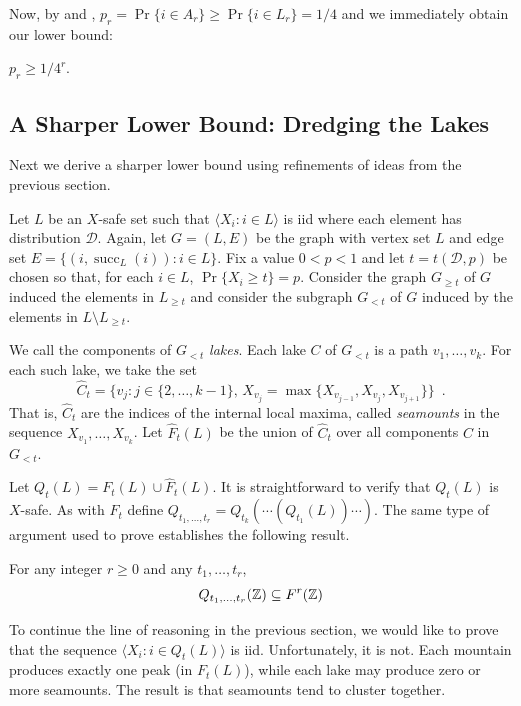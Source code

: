 \documentclass{patmorin}
\DeclareMathOperator{\cw}{succ}
\begin{document}
Now, by  and , $p_r=\Pr\{i\in
A_r\} \ge \Pr\{i\in L_r\}=1/4$ and we immediately obtain our lower bound:
\begin{cor}
   $p_r \ge 1/4^r$.
\end{cor}


\subsection{A Sharper Lower Bound: Dredging the Lakes}

Next we derive a sharper lower bound using refinements of ideas
from the previous section.

Let $L$ be an $X$-safe set such that $\langle X_i: i\in L\rangle$ is iid
where each element has distribution $\mathcal{D}$.  Again, let $G=(L,E)$
be the graph with vertex set $L$ and edge set $E=\{(i,\cw_L(i)): i\in
L\}$.  Fix a value $0<p<1$ and let $t=t(\mathcal{D},p)$ be chosen so that,
for each $i\in L$, $\Pr\{X_i\ge t\} = p$.  Consider the graph $G_{\ge
t}$ of $G$ induced the elements in $L_{\ge t}$ and consider the subgraph
$G_{<t}$ of $G$ induced by the elements in $L\setminus L_{\ge t}$.

We call the components of $G_{<t}$ \emph{lakes}.  Each lake $C$ of
$G_{<t}$ is a path $v_1,\ldots,v_k$.  For each such lake, we take the set
\[ 
    \hat{C}_t=\{v_j : j\in\{2,\ldots,k-1\},\, X_{v_j}=\max\{X_{v_{j-1}},X_{v_j},X_{v_{j+1}}\}\} \enspace .
\]
That is, $\hat{C}_t$ are the indices of the internal local maxima,
called \emph{seamounts} in the sequence $X_{v_1},\ldots,X_{v_k}$.
Let $\hat{F}_t(L)$ be the union of $\hat{C}_t$ over all components $C$
in $G_{<t}$.

Let $Q_t(L)= F_t(L)\cup \hat{F}_t(L)$. It is straightforward to verify
that $Q_t(L)$ is $X$-safe.  As with $F_t$ define $Q_{t_1,\ldots,t_r}=
Q_{t_k}(\cdots(Q_{t_1}(L))\cdots)$.  The same type of argument used to prove
 establishes the following result.

\begin{lem}
   For any integer $r\ge 0$ and any $t_1,\ldots,t_r$,
   \[  Q_{t_1,\ldots,t_r}(\mathbb{Z}) \subseteq F^{r}(\mathbb{Z})   \]
\end{lem}

To continue the line of reasoning in the previous section, we would like
to prove that the sequence $\langle X_i: i\in Q_t(L)\rangle$ is iid.
Unfortunately, it is not.  Each mountain produces exactly one peak
(in $F_t(L)$), while each lake may produce zero or more seamounts.
The result is that seamounts tend to cluster together.
\end{document}
